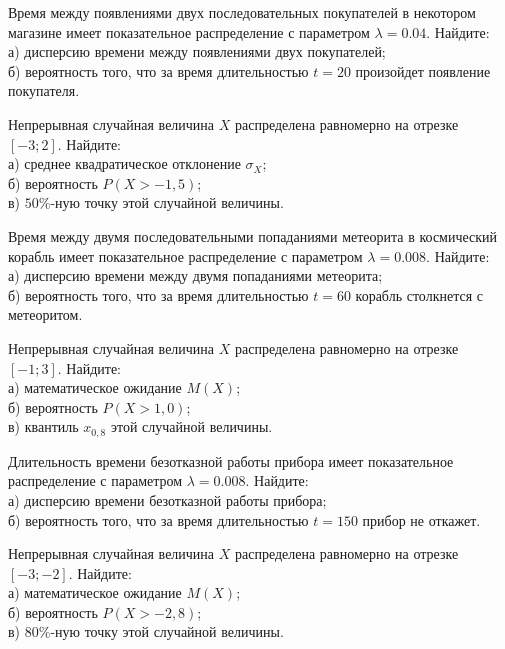 \vfill

\z Время между появлениями двух последовательных покупателей в некотором магазине имеет показательное распределение с параметром $\lambda = 0.04$. Найдите: \\ \quad а) дисперсию времени между появлениями двух покупателей; \\ \quad б) вероятность того, что за время длительностью $t = 20$  произойдет появление покупателя.
 

\vfill

\newpage\setcounter{zad}{0}

\z Непрерывная случайная величина $X$ распределена равномерно на отрезке $[-3; 2]$. Найдите: \\ \quad а) среднее квадратическое отклонение $\sigma_X$; \\ \quad б) вероятность $P(X>-1{,}5)$; \\ \quad в) $50\%$-ную точку этой случайной величины.


\vfill

\z Время между двумя последовательными попаданиями метеорита в космический корабль имеет показательное распределение с параметром $\lambda = 0.008$. Найдите: \\ \quad а) дисперсию времени между двумя попаданиями метеорита; \\ \quad б) вероятность того, что за время длительностью $t = 60$ корабль  столкнется с метеоритом.
 

\vfill

\newpage\setcounter{zad}{0}

\z Непрерывная случайная величина $X$ распределена равномерно на отрезке $[-1; 3]$. Найдите: \\ \quad а) математическое ожидание $M(X)$; \\ \quad б) вероятность $P(X>1{,}0)$; \\ \quad в) квантиль $x_{0{,}8}$ этой случайной величины.


\vfill

\z Длительность времени безотказной работы прибора имеет показательное распределение с параметром $\lambda = 0.008$. Найдите: \\ \quad а) дисперсию времени безотказной работы прибора; \\ \quad б) вероятность того, что за время длительностью $t = 150$ прибор не откажет.
 

\vfill

\newpage\setcounter{zad}{0}

\z Непрерывная случайная величина $X$ распределена равномерно на отрезке $[-3; -2]$. Найдите: \\ \quad а) математическое ожидание $M(X)$; \\ \quad б) вероятность $P(X>-2{,}8)$; \\ \quad в) $80\%$-ную точку этой случайной величины.



